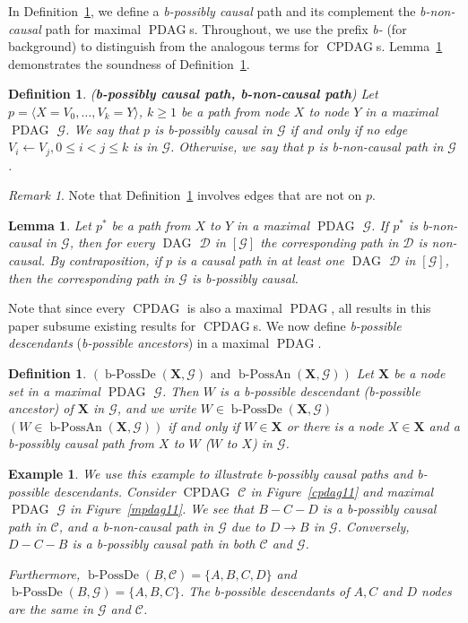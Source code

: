 \documentclass[letterpaper]{article}
\newtheorem{lemma}[theorem]{Lemma}
\newtheorem{definition}[theorem]{Definition}
\newtheorem{example}[theorem]{Example}
\theoremstyle{definition}
\theoremstyle{remark}
\newtheorem*{remark}{Remark}
\DeclareMathOperator{\PDAG}{PDAG}
\DeclareMathOperator{\CPDAG}{CPDAG}
\DeclareMathOperator{\DAG}{DAG}
\DeclareMathOperator{\bPossDe}{b-PossDe}
\DeclareMathOperator{\bPossAn}{b-PossAn}
\newcommand{\mpdag}{maximal $\PDAG$}
\newcommand{\g}[1][G]{\mathcal{#1}}
\newcommand{\pstar}[1][p]{{#1}^{*}}
\begin{document}
In Definition~\ref{def:posdir-path}, we define a \textit{b-possibly causal} path and its complement the \textit{b-non-causal} path for \mpdag{}s. Throughout, we use the prefix \textit{b-} (for background) to distinguish from the analogous terms for $\CPDAG$s. Lemma~\ref{lemma:posdir-path} demonstrates the soundness of Definition~\ref{def:posdir-path}.
\begin{definition}(\textbf{b-possibly causal path, b-non-causal path})
Let $p = \langle X=V_0, \dots , V_k=Y \rangle$, $k \geq 1$ be a path from node $X$ to node $Y$ in a \mpdag{} $\g$. We say that $p$ is b-possibly causal in $\g$ if and only if no edge $V_{i} \leftarrow V_{j}, 0 \le i < j \le k$ is in $\g$. Otherwise, we say that $p$ is b-non-causal path in $\g$.
\label{def:posdir-path}
\end{definition}
\begin{remark} Note that Definition~\ref{def:posdir-path} involves edges that are not on $p$.
\end{remark}
\begin{lemma}
Let $\pstar$ be a path from $X$ to $Y$ in a \mpdag{} $\g$. If $\pstar$ is b-non-causal in $\g$, then for every $\DAG$ $\g[D]$ in $[\g]$  the corresponding path in $\g[D]$ is non-causal. By contraposition, if $p$ is a causal path in at least one $\DAG$ $\g[D]$ in $[\g]$, then the corresponding path in $\g$ is b-possibly causal.
\label{lemma:posdir-path}
\end{lemma}
\noindent{}Note that since every $\CPDAG$ is also a \mpdag{}, all results in this paper subsume existing results for $\CPDAG$s.
We now define \textit{b-possible descendants} (\textit{b-possible ancestors}) in a \mpdag{}.
\begin{definition}$(\bPossDe(\mathbf{X},\g) \text{ and }\bPossAn(\mathbf{X},\g))$
Let $\textbf{X}$ be a node set in a \mpdag{} $\g$. Then $W$ is a b-possible descendant (b-possible ancestor) of $\mathbf{X}$ in $\g$, and we write $W \in \bPossDe(\mathbf{X},\g)$ $(W \in \bPossAn(\mathbf{X},\g))$ if and only if $W \in \mathbf{X}$ or there is a node $X \in \mathbf{X}$ and a b-possibly causal path from $X$ to $W$ ($W$ to $X$) in $\g$.
\label{def:posde-1}
\end{definition}

\begin{example}
We use this example to illustrate b-possibly causal paths and b-possible descendants.
Consider $\CPDAG$ $\g[C]$ in Figure~\ref{cpdag11} and \mpdag{} $\g$ in Figure~\ref{mpdag11}.
We see that $B - C - D$ is a b-possibly causal path in $\g[C]$, and a b-non-causal path in $\g$ due to $D \rightarrow B$ in $\g$.
Conversely, $D-C-B$ is a b-possibly causal path in both $\g[C]$ and $\g$.

Furthermore, $\bPossDe(B,\g[C]) = \{ A,B, C,D\}$ and $\bPossDe(B, \g) = \{A,B,C \}$.
The b-possible descendants of $A,C$ and $D$ nodes are the same in $\g$ and $\g[C]$.
\label{ex:allpossdec}
\end{example}
\end{document}
